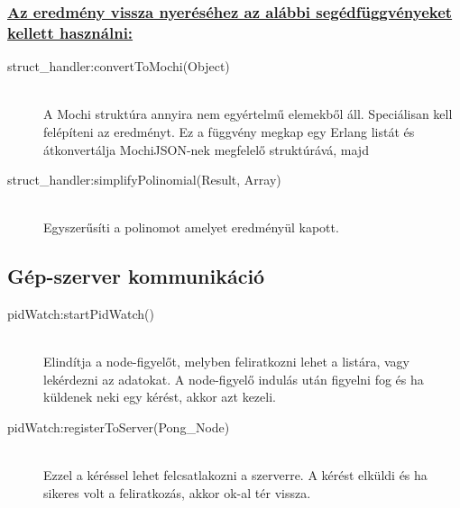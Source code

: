 	\subsubsection{\underline{Az eredmény vissza nyeréséhez az alábbi segédfüggvényeket kellett használni:}}
	\begin{description}
	
		\item[struct\_handler:convertToMochi(Object)] \hfill \\ 
		A Mochi struktúra annyira nem egyértelmű elemekből áll. Speciálisan kell felépíteni az eredményt. Ez a függvény megkap egy Erlang listát és átkonvertálja MochiJSON-nek megfelelő struktúrává, majd
		
		\item[struct\_handler:simplifyPolinomial(Result, Array) ] \hfill \\ 
		Egyszerűsíti a polinomot amelyet eredményül kapott.
	
	\end{description}
\subsection{Gép-szerver kommunikáció}
	\begin{description}
	\item[pidWatch:startPidWatch()]
	\hfill \\ Elindítja a node-figyelőt, melyben feliratkozni lehet a listára, vagy lekérdezni az adatokat. A node-figyelő indulás után figyelni fog és ha küldenek neki egy kérést, akkor azt kezeli. 
	\item[pidWatch:registerToServer(Pong\_Node)]
	\hfill \\ Ezzel a kéréssel lehet felcsatlakozni a szerverre. A kérést elküldi és ha sikeres volt a feliratkozás, akkor ok-al tér vissza.
	\end{description}
